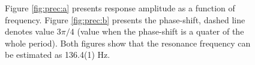 \documentclass{llncs}
\begin{document}
\begin{figure}
\begin{minipage}{.47\linewidth}
\end{minipage}
\caption{Figure \ref{fig:prec:a} presents response amplitude as a function of frequency. Figure \ref{fig:prec:b} presents the phase-shift, dashed line denotes value $3\pi/4$ (value when the phase-shift is a quater of the whole period).
Both figures show that the resonance frequency can be estimated as 136.4(1) Hz.}
\label{fig:prec}
\end{figure}





\end{document}
